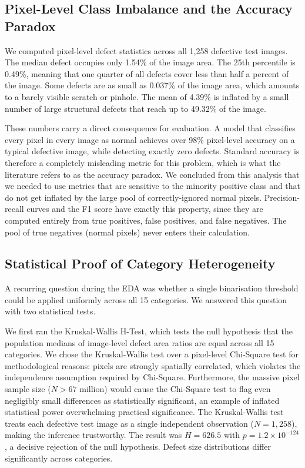 \documentclass[11pt, a4paper]{article}
\begin{document}
\subsection{Pixel-Level Class Imbalance and the Accuracy Paradox}
\label{sec:imbalance}

We computed pixel-level defect statistics across all 1,258 defective test images. The median defect occupies only 1.54\% of the image area. The 25th percentile is 0.49\%, meaning that one quarter of all defects cover less than half a percent of the image. Some defects are as small as 0.037\% of the image area, which amounts to a barely visible scratch or pinhole. The mean of 4.39\% is inflated by a small number of large structural defects that reach up to 49.32\% of the image.

These numbers carry a direct consequence for evaluation. A model that classifies every pixel in every image as normal achieves over 98\% pixel-level accuracy on a typical defective image, while detecting exactly zero defects. Standard accuracy is therefore a completely misleading metric for this problem, which is what the literature refers to as the accuracy paradox. We concluded from this analysis that we needed to use metrics that are sensitive to the minority positive class and that do not get inflated by the large pool of correctly-ignored normal pixels. Precision-recall curves and the F1 score have exactly this property, since they are computed entirely from true positives, false positives, and false negatives. The pool of true negatives (normal pixels) never enters their calculation.



\subsection{Statistical Proof of Category Heterogeneity}
\label{sec:statistics}

A recurring question during the EDA was whether a single binarisation threshold could be applied uniformly across all 15 categories. We answered this question with two statistical tests.

We first ran the Kruskal-Wallis H-Test, which tests the null hypothesis that the population medians of image-level defect area ratios are equal across all 15 categories. We chose the Kruskal-Wallis test over a pixel-level Chi-Square test for methodological reasons: pixels are strongly spatially correlated, which violates the independence assumption required by Chi-Square. Furthermore, the massive pixel sample size ($N > 67$ million) would cause the Chi-Square test to flag even negligibly small differences as statistically significant, an example of inflated statistical power overwhelming practical significance. The Kruskal-Wallis test treats each defective test image as a single independent observation ($N = 1,258$), making the inference trustworthy. The result was $H = 626.5$ with $p = 1.2 \times 10^{-124}$, a decisive rejection of the null hypothesis. Defect size distributions differ significantly across categories.
\end{document}
